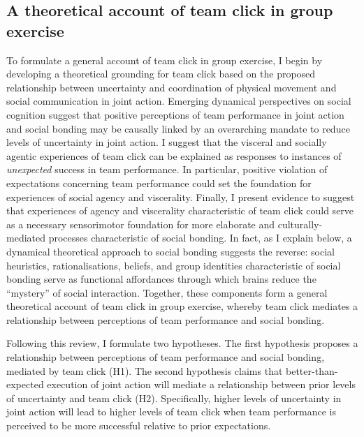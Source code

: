 \begin{CJK}{UTF8}{gbsn}




\section{A theoretical account of team click in group exercise\label{sect:theoryClickGE}}

To formulate a general account of team click in group exercise, I begin by developing a theoretical grounding for team click based on the proposed relationship between uncertainty and coordination of physical movement and social communication in joint action.  Emerging dynamical perspectives on social cognition suggest that positive perceptions of team performance in joint action and social bonding may be causally linked by an overarching mandate to reduce levels of uncertainty in joint action.  I suggest that the visceral and socially agentic experiences of team click can be explained as responses to instances of \textit{unexpected} success in team performance.  In particular, positive violation of expectations concerning team performance could set the foundation for experiences of social agency and viscerality.  Finally, I present evidence to suggest that experiences of agency and viscerality characteristic of team click could serve as a necessary sensorimotor foundation for more elaborate and culturally-mediated processes characteristic of social bonding.  In fact, as I explain below, a dynamical theoretical approach to social bonding suggests the reverse: social heuristics, rationalisations, beliefs, and group identities characteristic of social bonding serve as functional affordances through which brains reduce the ``mystery'' of social interaction.  Together, these components form a general theoretical account of team click in group exercise, whereby team click mediates a relationship between perceptions of team performance and social bonding.

Following this review, I formulate two hypotheses.  The first hypothesis proposes a relationship between perceptions of team performance and social bonding, mediated by team click (H1).  The second hypothesis claims that better-than-expected execution of joint action will mediate a relationship between prior levels of uncertainty and team click (H2).  Specifically, higher levels of uncertainty in joint action will lead to higher levels of team click when team performance is perceived to be more successful relative to prior expectations.



\end{CJK}
